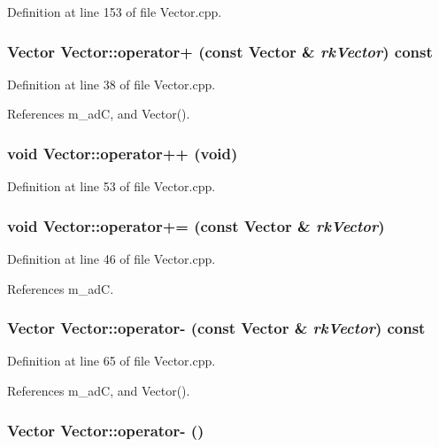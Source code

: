 Definition at line 153 of file Vector.cpp.
\subsubsection{\setlength{\rightskip}{0pt plus 5cm}Vector Vector::operator+ (const Vector \& {\em rk\-Vector}) const}\label{classdg_1_1Vector_a14}




Definition at line 38 of file Vector.cpp.

References m\_\-ad\-C, and Vector().
\subsubsection{\setlength{\rightskip}{0pt plus 5cm}void Vector::operator++ (void)}\label{classdg_1_1Vector_a16}




Definition at line 53 of file Vector.cpp.
\subsubsection{\setlength{\rightskip}{0pt plus 5cm}void Vector::operator+= (const Vector \& {\em rk\-Vector})}\label{classdg_1_1Vector_a15}




Definition at line 46 of file Vector.cpp.

References m\_\-ad\-C.
\subsubsection{\setlength{\rightskip}{0pt plus 5cm}Vector Vector::operator- (const Vector \& {\em rk\-Vector}) const}\label{classdg_1_1Vector_a18}




Definition at line 65 of file Vector.cpp.

References m\_\-ad\-C, and Vector().
\subsubsection{\setlength{\rightskip}{0pt plus 5cm}Vector Vector::operator- ()}\label{classdg_1_1Vector_a17}




